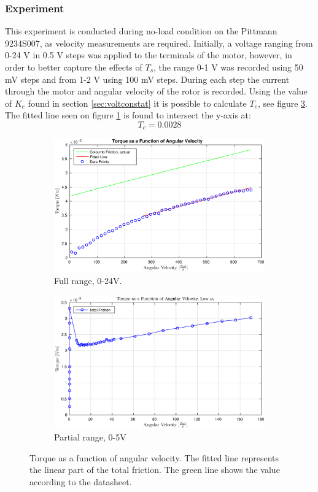 \subsubsection{Experiment}
This experiment is conducted during no-load condition on the Pittmann 9234S007, as velocity measurements are required.
Initially, a voltage ranging from 0-24 V in 0.5 V steps was applied to the terminals of the motor, however, in order to better capture the effects of $T_s$, the range 0-1 V was recorded using 50 mV steps and from 1-2 V using 100 mV steps.
During each step the current through the motor and angular velocity of the rotor is recorded.
Using the value of $K_e$ found in section \ref{sec:voltconstat} it is possible to calculate $T_e$, see figure \ref{fig:tqangle}. The fitted line seen on figure \ref{fig:tqanglefull} is found to intersect the y-axis at:
$$T_c=0.0028$$
\begin{figure}[!h]
	\begin{subfigure}[t]{.49\linewidth}
		\centering
		\includegraphics[width=\textwidth]{graphics/tevel}
		\caption{Full range, 0-24V.}
		\label{fig:tqanglefull}
	\end{subfigure}
	\begin{subfigure}[t]{.49\linewidth}
		\includegraphics[width=\textwidth]{graphics/tevel_low}
		\caption{Partial range, 0-5V}
		\label{fig:tqanglelow}
	\end{subfigure}
	\caption[Torque as a function of angular velocity]{Torque as a function of angular velocity. The fitted line represents the linear part of the total friction. The green line shows the value according to the datasheet.}
	\label{fig:tqangle}
\end{figure}

